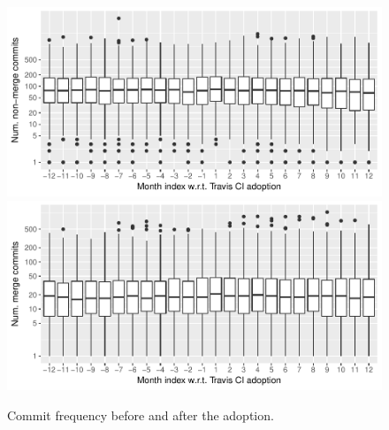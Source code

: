\begin{figure}[t]
\centering
\includegraphics[width=\columnwidth, clip=true, trim=0 0 0 32]{figures/freq-non-merge1.pdf}
\includegraphics[width=\columnwidth, clip=true, trim=0 0 0 0]{figures/freq-merge1.pdf}
\caption{Commit frequency before and after the \Tvis adoption.}
\label{fig:freq}
\end{figure}



%


